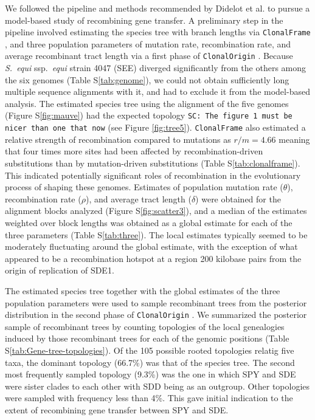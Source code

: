 \documentclass[10pt]{article}
\begin{document}
We followed the pipeline and methods recommended by Didelot et al.
\cite{Didelot2010} to pursue a model-based study of recombining gene transfer. A
preliminary step in the pipeline involved estimating the species tree with
branch lengths via \texttt{ClonalFrame} \cite{Didelot2007}, and three population
parameters of mutation rate, recombination rate, and average recombinant tract
length via a first phase of \texttt{ClonalOrigin} \cite{Didelot2010}.  Because
\textit{S.\ equi} ssp.\textit{\ equi} strain 4047 (SEE) diverged significantly
from the others among the six genomes (Table S\ref{tab:genome}), we could not
obtain sufficiently long multiple sequence alignments with it, and had to
exclude it from the model-based analysis.  The estimated species tree using the
alignment of the five genomes (Figure S\ref{fig:mauve}) had the expected
topology \texttt{SC: The figure 1 must be nicer than one that now} (see Figure
\ref{fig:tree5}). \texttt{ClonalFrame} also estimated a relative strength of
recombination compared to mutations as $r/m=4.66$ meaning that four times more
sites had been affected by recombination-driven substitutions than by
mutation-driven substitutions (Table S\ref{tab:clonalframe}).  This indicated
potentially significant roles of recombination in the evolutionary process of
shaping these genomes.  Estimates of population mutation rate ($\theta$),
recombination rate ($\rho$), and average tract length ($\delta$) were obtained
for the alignment blocks analyzed (Figure S\ref{fig:scatter3}), and a median of
the estimates weighted over block lengths was obtained as a global estimate for
each of the three parameters (Table S\ref{tab:three}).  The local estimates
typically seemed to be moderately fluctuating around the global estimate, with
the exception of what appeared to be a recombination hotspot at a region 200
kilobase pairs from the origin of replication of SDE1.  

The estimated species tree together with the global estimates of the three
population parameters were used to sample recombinant trees from the posterior
distribution in the second phase of \texttt{ClonalOrigin} \cite{Didelot2010}.
We summarized the posterior sample of recombinant trees by counting topologies
of the local genealogies induced by those recombinant trees for each of the
genomic positions (Table S\ref{tab:Gene-tree-topologies}).  Of the 105 possible
rooted topologies relatig five taxa, the dominant topology (66.7\%) was that of
the species tree.  The second most frequently sampled topology (9.3\%) was the
one in which SPY and SDE were sister clades to each other with SDD being as an
outgroup. Other topologies were sampled with frequency less than 4\%. This gave
initial indication to the extent of recombining gene transfer  between SPY and
SDE.
\end{document}

